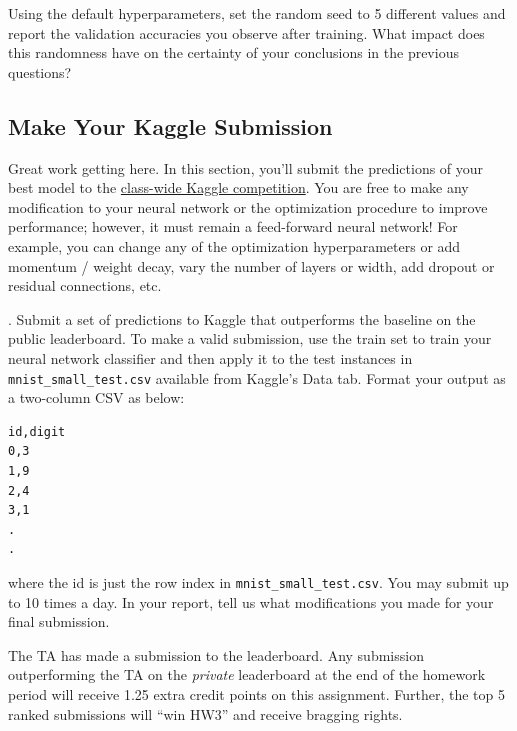 \documentclass[a4paper,10pt]{article}
\begin{document}
\begin{taskbox}
 Using the default hyperparameters, set the random seed to 5 different values and report the validation accuracies you observe after training. What impact does this randomness have on the certainty of your conclusions in the previous questions?
\end{taskbox}



\subsection{Make Your Kaggle Submission}

Great work getting here. In this section, you'll submit the predictions of your best model to the \href{https://www.kaggle.com/t/c4de5ee4c2ef45858c15e3183d24b2c0}{class-wide Kaggle competition}. You are free to make any modification to your neural network or the optimization procedure to improve performance; however, it must remain a feed-forward neural network! For example, you can change any of the optimization hyperparameters or add momentum / weight decay, vary the number of layers or width, add dropout or residual connections, etc.

\begin{taskbox}
. Submit a set of predictions to Kaggle that outperforms the baseline on the public leaderboard. To make a valid submission, use the train set to train your neural network classifier and then apply it to the test instances in \texttt{mnist\_small\_test.csv} available from Kaggle's Data tab. Format your output as a two-column CSV as below:
\begin{verbatim}
id,digit
0,3
1,9
2,4
3,1
.
.
\end{verbatim}
where the id is just the row index in \texttt{mnist\_small\_test.csv}. You may submit up to 10 times a day. In your report, tell us what modifications you made for your final submission.
\end{taskbox}


 The TA has made a submission to the leaderboard. Any submission outperforming the TA on the \emph{private} leaderboard at the end of the homework period will receive 1.25 extra credit points on this assignment. Further, the top 5 ranked submissions will ``win HW3'' and receive bragging rights. 
\end{document}
